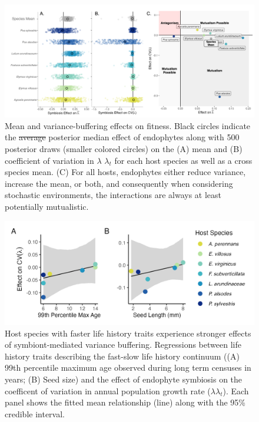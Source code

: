 \documentclass[lineno,sn-nature]{sn-jnl}%
\providecommand{\DIFadd}[1]{{\protect\color{blue}#1}} %
\providecommand{\DIFdel}[1]{{\protect\color{red}\protect\scriptsize\sout{#1}}}
\providecommand{\DIFadd}[1]{{\protect\color{blue}\uwave{#1}}} %
\providecommand{\DIFdel}[1]{{\protect\color{red}\sout{#1}}}                      %
\providecommand{\DIFaddend}{} %
\providecommand{\DIFaddFL}[1]{\DIFadd{#1}} %
\providecommand{\DIFdelFL}[1]{\DIFdel{#1}} %
\providecommand{\DIFaddbeginFL}{} %
\providecommand{\DIFaddendFL}{} %
\providecommand{\DIFdelbeginFL}{} %
\providecommand{\DIFdelendFL}{} %
\newcommand{\DIFscaledelfig}{0.5}
\newlength{\DIFdelgraphicswidth} %
\newlength{\DIFdelgraphicsheight} %
\newcommand{\DIFaddincludegraphics}[2][]{{\color{blue}\fbox{\DIFOincludegraphics[#1]{#2}}}} %
\newcommand{\DIFdelincludegraphics}[2][]{%
\sbox{\DIFdelgraphicsbox}{\DIFOincludegraphics[#1]{#2}}%
\settoboxwidth{\DIFdelgraphicswidth}{\DIFdelgraphicsbox} %
\settoboxtotalheight{\DIFdelgraphicsheight}{\DIFdelgraphicsbox} %
\scalebox{\DIFscaledelfig}{%
\parbox[b]{\DIFdelgraphicswidth}{\usebox{\DIFdelgraphicsbox}\\[-\baselineskip] \rule{\DIFdelgraphicswidth}{0em}}\llap{\resizebox{\DIFdelgraphicswidth}{\DIFdelgraphicsheight}{%
\setlength{\unitlength}{\DIFdelgraphicswidth}%
\begin{picture}(1,1)%
\thicklines\linethickness{2pt} %
{\color[rgb]{1,0,0}\put(0,0){\framebox(1,1){}}}%
{\color[rgb]{1,0,0}\put(0,0){\line( 1,1){1}}}%
{\color[rgb]{1,0,0}\put(0,1){\line(1,-1){1}}}%
\end{picture}%
}\hspace*{3pt}}} %
} %
\DeclareRobustCommand{\DIFaddend}{\DIFOaddend \let\includegraphics\DIFOincludegraphics} %
\DeclareRobustCommand{\DIFaddbeginFL}{\DIFOaddbeginFL \let\includegraphics\DIFaddincludegraphics} %
\DeclareRobustCommand{\DIFaddendFL}{\DIFOaddendFL \let\includegraphics\DIFOincludegraphics} %
\DeclareRobustCommand{\DIFdelbeginFL}{\DIFOdelbeginFL \let\includegraphics\DIFdelincludegraphics} %
\DeclareRobustCommand{\DIFdelendFL}{\DIFOaddendFL \let\includegraphics\DIFOincludegraphics} %
\begin{document}
\DIFaddend \begin{figure}
	\centering
	\DIFdelbeginFL %
\DIFdelendFL \DIFaddbeginFL \includegraphics[width =\linewidth]{StochDemo_newFig3.png}
	\DIFaddendFL \caption{Mean and variance-buffering effects on fitness. Black circles indicate the \DIFdelbeginFL \DIFdelFL{average }\DIFdelendFL \DIFaddbeginFL \DIFaddFL{posterior median }\DIFaddendFL effect of endophytes along with 500 posterior draws (smaller colored circles) on the (A) mean and (B) coefficient of variation in \DIFdelbeginFL \DIFdelFL{$\lambda$ }\DIFdelendFL \DIFaddbeginFL \DIFaddFL{$\lambda_{t}$ }\DIFaddendFL for each host species as well as a cross species mean. (C) For all hosts, endophytes either reduce variance, increase the mean, or both, and consequently when considering stochastic environments, the interactions are always at least potentially mutualistic.}
\end{figure}

\begin{figure}
	\centering
	\DIFdelbeginFL %
\DIFdelendFL \DIFaddbeginFL \includegraphics[width=.8\linewidth]{StochDemo_fig4new.png}
	\DIFaddendFL \caption{Host species with faster life history traits experience stronger effects of symbiont-mediated variance buffering. Regressions between life history traits describing the fast-slow life history continuum ((A) 99th percentile maximum age observed during long term censuses in years; (B) Seed size) and the effect of endophyte symbiosis on the coefficent of variation in \DIFaddbeginFL \DIFaddFL{annual }\DIFaddendFL population growth rate (\DIFdelbeginFL \DIFdelFL{$\lambda$}\DIFdelendFL \DIFaddbeginFL \DIFaddFL{$\lambda_{t}$}\DIFaddendFL ). Each panel shows the fitted mean relationship (line) along with the 95\% credible interval.}
\end{figure}
\end{document}

